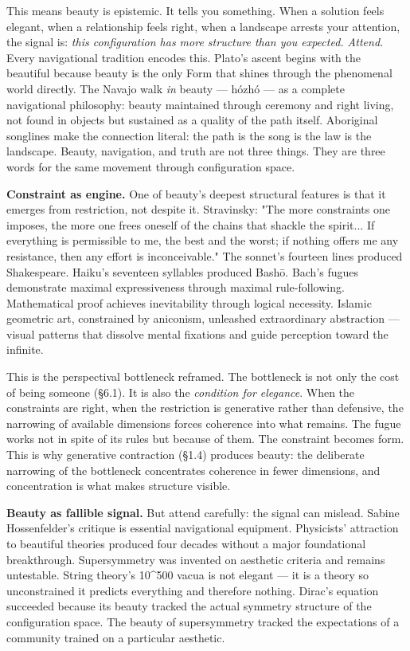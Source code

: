 This means beauty is epistemic. It tells you something. When a solution feels elegant, when a relationship feels right, when a landscape arrests your attention, the signal is: \textit{this configuration has more structure than you expected. Attend.} Every navigational tradition encodes this. Plato's ascent begins with the beautiful because beauty is the only Form that shines through the phenomenal world directly. The Navajo walk \textit{in} beauty — hózhó — as a complete navigational philosophy: beauty maintained through ceremony and right living, not found in objects but sustained as a quality of the path itself. Aboriginal songlines make the connection literal: the path is the song is the law is the landscape. Beauty, navigation, and truth are not three things. They are three words for the same movement through configuration space.


\textbf{Constraint as engine.} One of beauty's deepest structural features is that it emerges from restriction, not despite it. Stravinsky: "The more constraints one imposes, the more one frees oneself of the chains that shackle the spirit... If everything is permissible to me, the best and the worst; if nothing offers me any resistance, then any effort is inconceivable." The sonnet's fourteen lines produced Shakespeare. Haiku's seventeen syllables produced Bashō. Bach's fugues demonstrate maximal expressiveness through maximal rule-following. Mathematical proof achieves inevitability through logical necessity. Islamic geometric art, constrained by aniconism, unleashed extraordinary abstraction — visual patterns that dissolve mental fixations and guide perception toward the infinite.


This is the perspectival bottleneck reframed. The bottleneck is not only the cost of being someone (§6.1). It is also the \textit{condition for elegance}. When the constraints are right, when the restriction is generative rather than defensive, the narrowing of available dimensions forces coherence into what remains. The fugue works not in spite of its rules but because of them. The constraint becomes form. This is why generative contraction (§1.4) produces beauty: the deliberate narrowing of the bottleneck concentrates coherence in fewer dimensions, and concentration is what makes structure visible.


\textbf{Beauty as fallible signal.} But attend carefully: the signal can mislead. Sabine Hossenfelder's critique is essential navigational equipment. Physicists' attraction to beautiful theories produced four decades without a major foundational breakthrough. Supersymmetry was invented on aesthetic criteria and remains untestable. String theory's 10\textasciicircum{}500 vacua is not elegant — it is a theory so unconstrained it predicts everything and therefore nothing. Dirac's equation succeeded because its beauty tracked the actual symmetry structure of the configuration space. The beauty of supersymmetry tracked the expectations of a community trained on a particular aesthetic.


